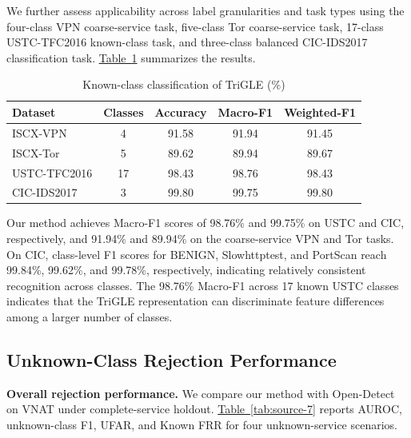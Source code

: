 We further assess applicability across label granularities and task types using the four-class VPN coarse-service task, five-class Tor coarse-service task, 17-class USTC-TFC2016 known-class task, and three-class balanced CIC-IDS2017 classification task. \hyperref[tab:source-6]{Table~\ref*{tab:source-6}} summarizes the results.


\begin{table}[H]
\centering
\begingroup
\renewcommand{\thetable}{4-6}
\caption{Known-class classification of TriGLE (\%)}\label{tab:source-6}
\fontsize{7}{8.5}\selectfont
\setlength{\tabcolsep}{2pt}
\begin{tabular}{@{}lcccc@{}}
\hline
Dataset & Classes & Accuracy & Macro-F1 & Weighted-F1 \\
\hline
ISCX-VPN & 4 & 91.58 & 91.94 & 91.45 \\
ISCX-Tor & 5 & 89.62 & 89.94 & 89.67 \\
USTC-TFC2016 & 17 & 98.43 & 98.76 & 98.43 \\
CIC-IDS2017 & 3 & 99.80 & 99.75 & 99.80 \\
\hline
\end{tabular}
\endgroup
\end{table}


Our method achieves Macro-F1 scores of 98.76\% and 99.75\% on USTC and CIC, respectively, and 91.94\% and 89.94\% on the coarse-service VPN and Tor tasks. On CIC, class-level F1 scores for BENIGN, Slowhttptest, and PortScan reach 99.84\%, 99.62\%, and 99.78\%, respectively, indicating relatively consistent recognition across classes. The 98.76\% Macro-F1 across 17 known USTC classes indicates that the TriGLE representation can discriminate feature differences among a larger number of classes.

\subsection{Unknown-Class Rejection Performance}\label{sec:unknown-rejection}
\textbf{Overall rejection performance.} We compare our method with Open-Detect on VNAT under complete-service holdout. \hyperref[tab:source-7]{Table~\ref*{tab:source-7}} reports AUROC, unknown-class F1, UFAR, and Known FRR for four unknown-service scenarios.


